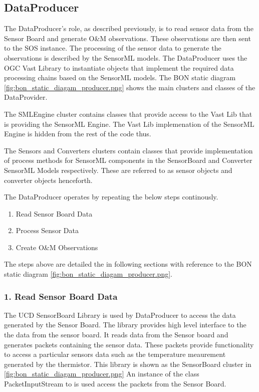 \documentclass[]{final_report}
\begin{document}
\newpage
\subsection{DataProducer}
The DataProducer's role, as described previously, is to read sensor data from the Sensor Board and generate O\&M observations. These observations are then sent to the SOS instance. The processing of the sensor data to generate the observations is described by the SensorML models. The DataProducer uses the OGC Vast Library to instantiate objects that implement the required data processing chains based on the SensorML models. The BON static diagram \ref{fig:bon_static_diagam_producer.png}
 shows the main clusters and classes of the DataProvider.

The SMLEngine cluster contains classes that provide access to
the Vast Lib that is providing the SensorML Engine.  The Vast Lib implemenation
of the SensorML Engine is hidden from the rest of the code thus.

The Sensors and Converters clusters contain classes that provide
implementation of process methods for SensorML components in the SensorBoard and
Converter SensorML Models respectively. These are referred to as sensor objects and
converter objects henceforth.

The DataProducer operates by repeating the below steps continously.
 \begin{enumerate}
\item Read Sensor Board Data
\item Process Sensor Data
\item Create O\&M Observations
\end{enumerate}
The steps above are detailed the in following sections with reference
to the BON static diagram \ref{fig:bon_static_diagam_producer.png}.

\subsubsection {1. Read Sensor Board Data}

The UCD SensorBoard Library is used by DataProducer to access
the data generated by the Sensor Board.
The library provides high level interface to the
the data from the sensor board. It reads data from the Sensor board and generates packets
containing the sensor data. These packets provide functionality
to access a particular sensors data such as the temperature
meaurement generated by the thermistor. 
This library is shown as the SensorBoard cluster in \ref{fig:bon_static_diagam_producer.png}
An instance of the class PacketInputStream to is used access the packets from the Sensor Board.
\end{document}
